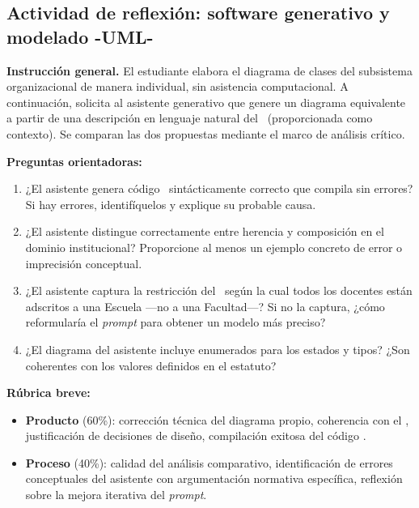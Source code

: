\subsection*{Actividad de reflexión: software generativo y modelado -UML-}
\label{act:ia-sprint4}

\begin{tcolorbox}[actividadIA,
  title={Actividad de reflexión (Sprint~4) —
         Software generativo y modelado -UML-}]

\textbf{Instrucción general.}
El estudiante elabora el diagrama de clases del subsistema organizacional
de manera individual, sin asistencia computacional. A continuación, solicita
al asistente generativo que genere un diagrama equivalente a partir de una
descripción en lenguaje natural del \acuerdo\ (proporcionada como contexto).
Se comparan las dos propuestas mediante el marco de análisis crítico.

\bigskip
\textbf{Preguntas orientadoras:}
\begin{enumerate}[label=\arabic*.]
  \item ¿El asistente genera código \plantuml\ sintácticamente correcto
        que compila sin errores? Si hay errores, identifíquelos y explique
        su probable causa.
  \item ¿El asistente distingue correctamente entre herencia y composición
        en el dominio institucional? Proporcione al menos un ejemplo concreto
        de error o imprecisión conceptual.
  \item ¿El asistente captura la restricción del \acuerdo\ según la cual
        todos los docentes están adscritos a una Escuela ---no a una
        Facultad---? Si no la captura, ¿cómo reformularía el \textit{prompt}
        para obtener un modelo más preciso?
  \item ¿El diagrama del asistente incluye enumerados para los estados
        y tipos? ¿Son coherentes con los valores definidos en el estatuto?
\end{enumerate}

\bigskip
\textbf{Rúbrica breve:}
\begin{itemize}
  \item \textbf{Producto} (60\%): corrección técnica del diagrama propio,
        coherencia con el \acuerdo, justificación de decisiones de diseño,
        compilación exitosa del código \plantuml.
  \item \textbf{Proceso} (40\%): calidad del análisis comparativo,
        identificación de errores conceptuales del asistente con
        argumentación normativa específica, reflexión sobre la mejora
        iterativa del \textit{prompt}.
\end{itemize}

\end{tcolorbox}

